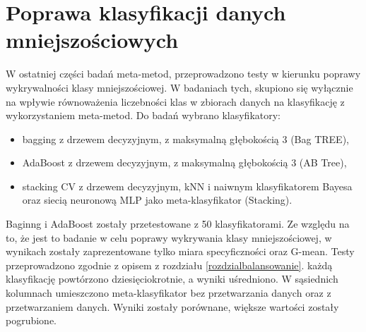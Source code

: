 \section{Poprawa klasyfikacji danych mniejszościowych}
W ostatniej części badań meta-metod, przeprowadzono testy w kierunku poprawy wykrywalności klasy mniejszościowej. W badaniach tych, skupiono się wyłącznie na wpływie równoważenia liczebności klas w zbiorach danych na klasyfikację z wykorzystaniem meta-metod. Do badań wybrano klasyfikatory: 
\begin{itemize}
	\item bagging z drzewem decyzyjnym, z maksymalną głębokością 3 (Bag TREE),
	\item AdaBoost z drzewem decyzyjnym, z maksymalną głębokością 3 (AB Tree),
	\item stacking CV z drzewem decyzyjnym, kNN i naiwnym klasyfikatorem Bayesa oraz siecią neuronową MLP jako meta-klasyfikator (Stacking).
\end{itemize}
Baginng i AdaBoost zostały przetestowane z 50 klasyfikatorami. Ze względu na to, że jest to badanie w celu poprawy wykrywania klasy mniejszościowej, w wynikach zostały zaprezentowane tylko miara specyficzności oraz G-mean. Testy przeprowadzono zgodnie z opisem z rozdziału \ref{rozdzialbalansowanie}. każdą klasyfikację powtórzono dziesięciokrotnie, a wyniki uśredniono. W sąsiednich kolumnach umieszczono meta-klasyfikator bez przetwarzania danych oraz z przetwarzaniem danych. Wyniki zostały porównane, większe wartości zostały pogrubione.
